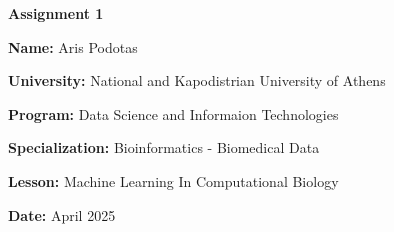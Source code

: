 \documentclass[12pt, a4paper]{article}
\author{Aris Podotas}
\date{}
\begin{document}
\begin{titlepage}
    \centering
    {\huge \textbf{Assignment 1}\par}
    \vspace{0.5cm}
    {\Large \textbf{Name:} Aris Podotas\par}
    \vspace{0.5cm}
    {\large \textbf{University:} National and Kapodistrian University of Athens\par}
    \vspace{0.5cm}
    {\large \textbf{Program:} Data Science and Informaion Technologies\par}
    \vspace{0.5cm}
    {\large \textbf{Specialization:} Bioinformatics - Biomedical Data\par}
    \vspace{0.5cm}
    {\large \textbf{Lesson:} Machine Learning In Computational Biology\par}
    \vspace{0.5cm}
    {\large \textbf{Date:} April 2025\par}
    \tableofcontents
\end{titlepage}
\end{document}
